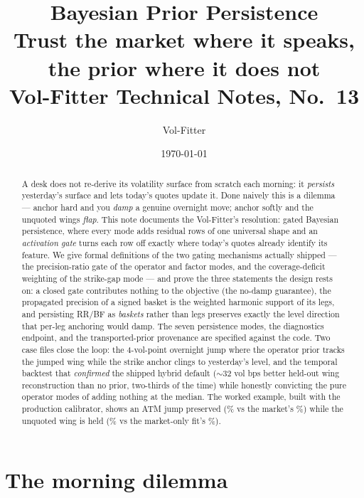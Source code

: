\documentclass[11pt]{article}
\title{\textbf{Bayesian Prior Persistence}\\[2pt]
\large Trust the market where it speaks, the prior where it does not\\[2pt]
\normalsize Vol-Fitter Technical Notes, No.~13}
\author{Vol-Fitter}
\date{\today}
\begin{document}
\maketitle


\begin{abstract}
A desk does not re-derive its volatility surface from scratch each morning: it
\emph{persists} yesterday's surface and lets today's quotes update it. Done
naively this is a dilemma --- anchor hard and you \emph{damp} a genuine
overnight move; anchor softly and the unquoted wings \emph{flap}. This note
documents the Vol-Fitter's resolution: gated Bayesian persistence, where every
mode adds residual rows of one universal shape and an \emph{activation gate}
turns each row off exactly where today's quotes already identify its feature.
We give formal definitions of the two gating mechanisms actually shipped ---
the precision-ratio gate of the operator and factor modes, and the
coverage-deficit weighting of the strike-gap mode --- and prove the three
statements the design rests on: a closed gate contributes nothing to the
objective (the no-damp guarantee), the propagated precision of a signed basket
is the weighted harmonic support of its legs, and persisting RR/BF as
\emph{baskets} rather than legs preserves exactly the level direction that
per-leg anchoring would damp. The seven persistence modes, the diagnostics
endpoint, and the transported-prior provenance are specified against the code.
Two case files close the loop: the 4-vol-point overnight jump where the
operator prior tracks the jumped wing while the strike anchor clings to
yesterday's level, and the temporal backtest that \emph{confirmed} the shipped
hybrid default ($\sim32$ vol bps better held-out wing reconstruction than no
prior, two-thirds of the time) while honestly convicting the pure operator
modes of adding nothing at the median. The worked example, built with the
production calibrator, shows an ATM jump preserved (\priatmpersist\% vs the
market's \priatmmarket\%) while the unquoted wing is held
(\priwingps\% vs the market-only fit's \priwingmo\%).
\end{abstract}

\tableofcontents
\newpage

\section{The morning dilemma}
\label{sec:dilemma}
\end{document}

